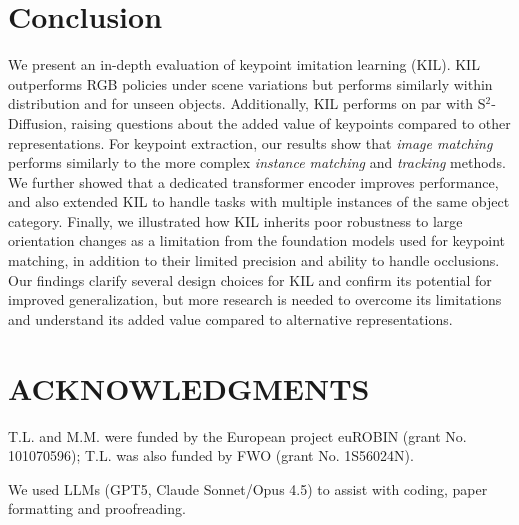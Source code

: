 \documentclass[letterpaper, 10 pt, conference]{ieeeconf}  %
\newif\ifanonymous
\begin{document}
\section{Conclusion}

We present an in-depth evaluation of keypoint imitation learning (KIL). KIL outperforms RGB policies under scene variations but performs similarly within distribution and for unseen objects. Additionally, KIL performs on par with S$^2$-Diffusion, raising questions about the added value of keypoints compared to other representations. For keypoint extraction, our results show that \textit{image matching }performs similarly to the more complex  \textit{instance matching} and \textit{tracking} methods. We further showed that a dedicated transformer encoder improves performance, and also extended KIL to handle tasks with multiple instances of the same object category. Finally, we illustrated how KIL inherits poor robustness to large orientation changes as a limitation from the foundation models used for keypoint matching, in addition to their limited precision and ability to handle occlusions. 
Our findings clarify several design choices for KIL and confirm its potential for improved generalization, but more research is needed to overcome its limitations and understand its added value compared to alternative representations.

\section*{ACKNOWLEDGMENTS}
\ifanonymous
Funding anonymized for double-blind review.
\else
T.L. and M.M. were funded by the European project euROBIN (grant No. 101070596); T.L. was also funded by FWO (grant No. 1S56024N).
\fi

We used LLMs (GPT5, Claude Sonnet/Opus 4.5) to assist with coding, paper formatting and proofreading.

\end{document}
